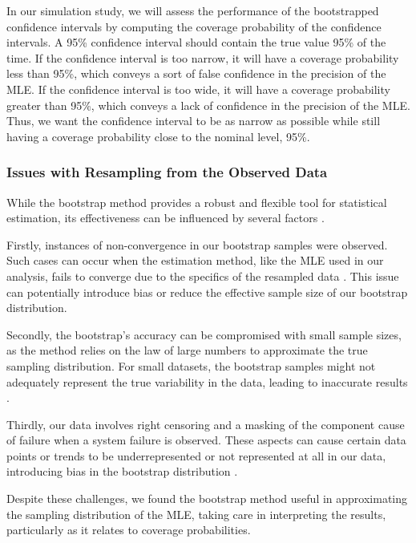\documentclass[
]{article}
\begin{document}
In our simulation study, we will assess the performance of the
bootstrapped confidence intervals by computing the coverage probability
of the confidence intervals. A 95\% confidence interval should contain
the true value 95\% of the time. If the confidence interval is too
narrow, it will have a coverage probability less than 95\%, which
conveys a sort of false confidence in the precision of the MLE. If the
confidence interval is too wide, it will have a coverage probability
greater than 95\%, which conveys a lack of confidence in the precision
of the MLE. Thus, we want the confidence interval to be as narrow as
possible while still having a coverage probability close to the nominal
level, 95\%.

\hypertarget{issues-with-resampling-from-the-observed-data}{%
\subsubsection*{Issues with Resampling from the Observed
Data}\label{issues-with-resampling-from-the-observed-data}}

While the bootstrap method provides a robust and flexible tool for
statistical estimation, its effectiveness can be influenced by several
factors \citep{efron1994introduction}.

Firstly, instances of non-convergence in our bootstrap samples were
observed. Such cases can occur when the estimation method, like the MLE
used in our analysis, fails to converge due to the specifics of the
resampled data \citep{casella2002statistical}. This issue can
potentially introduce bias or reduce the effective sample size of our
bootstrap distribution.

Secondly, the bootstrap's accuracy can be compromised with small sample
sizes, as the method relies on the law of large numbers to approximate
the true sampling distribution. For small datasets, the bootstrap
samples might not adequately represent the true variability in the data,
leading to inaccurate results \citep{efron1994introduction}.

Thirdly, our data involves right censoring and a masking of the
component cause of failure when a system failure is observed. These
aspects can cause certain data points or trends to be underrepresented
or not represented at all in our data, introducing bias in the bootstrap
distribution \citep{klein2005survival}.

Despite these challenges, we found the bootstrap method useful in
approximating the sampling distribution of the MLE, taking care in
interpreting the results, particularly as it relates to coverage
probabilities.
\end{document}
